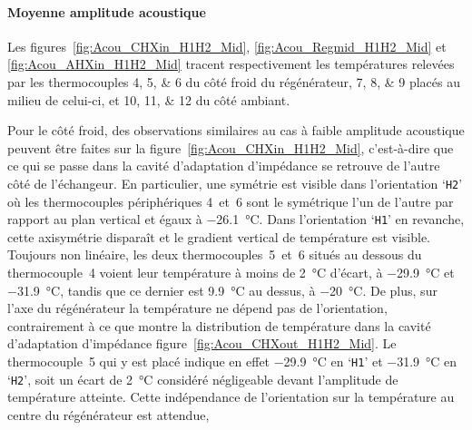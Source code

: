 %    

\paragraph*{Moyenne amplitude acoustique}
Les figures~\ref{fig:Acou_CHXin_H1H2_Mid}, \ref{fig:Acou_Regmid_H1H2_Mid} et \ref{fig:Acou_AHXin_H1H2_Mid} tracent respectivement les températures relevées par les thermocouples \numlist{4;5;6} du côté froid du régénérateur, \numlist{7;8;9} placés au milieu de celui-ci, et \numlist{10;11;12} du côté ambiant.

Pour le côté froid, des observations similaires au cas à faible amplitude acoustique peuvent être faites sur la figure~\ref{fig:Acou_CHXin_H1H2_Mid}, c'est-à-dire que ce qui se passe dans la cavité d'adaptation d'impédance se retrouve de l'autre côté de l'échangeur. En particulier, une symétrie est visible dans l'orientation `\texttt{H2}' où les thermocouples périphériques 4~et~6 sont le symétrique l'un de l'autre par rapport au plan vertical et égaux à \qty{-26.1}{\degreeCelsius}. Dans l'orientation `\texttt{H1}' en revanche, cette axisymétrie disparaît et le gradient vertical de température est visible. Toujours non linéaire, les deux thermocouples~5~et~6 situés au dessous du thermocouple~4 voient leur température à moins de \qty{2}{\degreeCelsius} d'écart, à \qty{-29.9}{\degreeCelsius} et \qty{-31.9}{\degreeCelsius}, tandis que ce dernier est \qty{9.9}{\degreeCelsius} au dessus, à \qty{-20}{\degreeCelsius}.
De plus, sur l'axe du régénérateur la température ne dépend pas de l'orientation, contrairement à ce que montre la distribution de température dans la cavité d'adaptation d'impédance figure~\ref{fig:Acou_CHXout_H1H2_Mid}. Le thermocouple~5 qui y est placé indique en effet \qty{-29,9}{\degreeCelsius} en `\texttt{H1}' et \qty{-31.9}{\degreeCelsius} en `\texttt{H2}', soit un écart de \qty{2}{\degreeCelsius} considéré négligeable devant l'amplitude de température atteinte. Cette indépendance de l'orientation sur la température au centre du régénérateur est attendue, 

